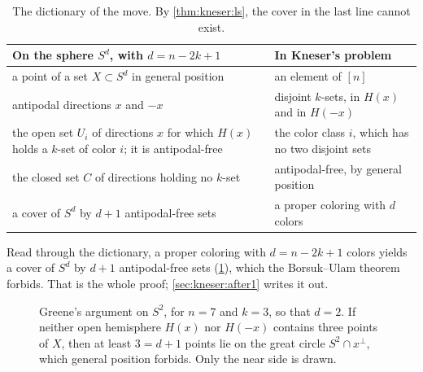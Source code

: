 \begin{refsection}
\begin{table}[t]
\small\renewcommand{\arraystretch}{1.18}%
\begin{tabularx}{\linewidth}{@{}>{\raggedright\arraybackslash}X>{\raggedright\arraybackslash}X@{}}
\toprule
On the sphere $S^d$, with $d=n-2k+1$ & In Kneser's problem\\
\midrule
a point of a set $X\subset S^d$ in general position & an element of $[n]$\\
antipodal directions $x$ and $-x$ & disjoint $k$-sets, in $H(x)$ and in $H(-x)$\\
the open set $U_i$ of directions $x$ for which $H(x)$ holds a $k$-set of color $i$; it is antipodal-free & the color class $i$, which has no two disjoint sets\\
the closed set $C$ of directions holding no $k$-set & antipodal-free, by general position\\
a cover of $S^d$ by $d+1$ antipodal-free sets & a proper coloring with $d$ colors\\
\bottomrule
\end{tabularx}
\caption{The dictionary of the move. By \cref{thm:kneser:ls}, the cover in the last line cannot exist.}
\label{tab:kneser:dictionary}
\end{table}

Read through the dictionary, a proper coloring with $d=n-2k+1$ colors yields a cover of $S^d$ by $d+1$ antipodal-free sets (\cref{fig:kneser:hemispheres}), which the Borsuk--Ulam theorem forbids. That is the whole proof; \cref{sec:kneser:after1} writes it out.

\begin{figure}[t]
\centering
{}
\caption{Greene's argument on $S^2$, for $n=7$ and $k=3$, so that $d=2$. If neither open hemisphere $H(x)$ nor $H(-x)$ contains three points of $X$, then at least $3=d+1$ points lie on the great circle $S^2\cap x^\perp$, which general position forbids. Only the near side is drawn.}
\label{fig:kneser:hemispheres}
\end{figure}


\end{refsection}
